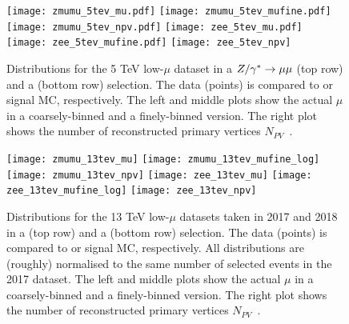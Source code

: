 	\begin{figure}[tph]
		\centering
		\texttt{[image: zmumu\_5tev\_mu.pdf]}%
		\texttt{[image: zmumu\_5tev\_mufine.pdf]}%
		\texttt{[image: zmumu\_5tev\_npv.pdf]}
		\texttt{[image: zee\_5tev\_mu.pdf]}%
		\texttt{[image: zee\_5tev\_mufine.pdf]}%
		\texttt{[image: zee\_5tev\_npv]}
		\caption{Distributions for the 5 TeV low-$\mu$ dataset in a $Z/\gamma^* \rightarrow \mu\mu$
			(top row) and a \Zgee (bottom row) selection. The data (points) is
			compared to \Zgmm or \Zgee signal MC, respectively. The left and
			middle plots show the actual $\mu$ in a coarsely-binned and a
			finely-binned version. The right plot shows the number of
			reconstructed primary vertices $N_{PV}$~\cite{int_note_samples}.}
		\label{fig:mu5}
	\end{figure}
	
	\begin{figure}[tph]
		\centering
		\texttt{[image: zmumu\_13tev\_mu]}%
		\texttt{[image: zmumu\_13tev\_mufine\_log]}%
		\texttt{[image: zmumu\_13tev\_npv]}
		\texttt{[image: zee\_13tev\_mu]}%
		\texttt{[image: zee\_13tev\_mufine\_log]}%
		\texttt{[image: zee\_13tev\_npv]}
		\caption{Distributions for the 13 TeV low-$\mu$ datasets taken in
			2017 and 2018 in a \Zgmm (top row) and a \Zgee (bottom row)
			selection. The data (points) is compared to \Zgmm or \Zgee signal
			MC, respectively. All distributions are (roughly) normalised to
			the same number of selected events in the 2017 dataset. The left
			and middle plots show the actual $\mu$ in a coarsely-binned and a
			finely-binned version. The right plot shows the number of
			reconstructed primary vertices $N_{PV}$~\cite{int_note_samples}.}
		\label{fig:mu13}
	\end{figure}
	
